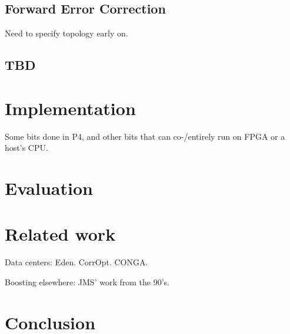 \documentclass[sigconf]{acmart}
\begin{document}
\subsection{Forward Error Correction}
Need to specify topology early on.
\subsection{TBD}
\section{Implementation}
Some bits done in P4, and other bits that can co-/entirely run on FPGA or a host's CPU.
\section{Evaluation}
\section{Related work}
Data centers:
Eden.
CorrOpt.
CONGA.

Boosting elsewhere: JMS' work from the 90's.
\section{Conclusion}


 
\end{document}
